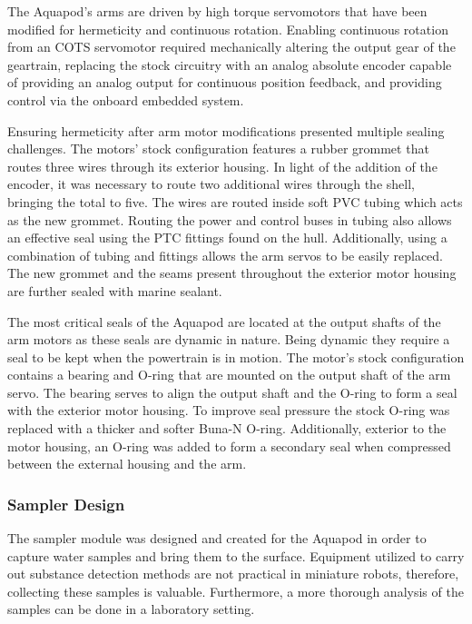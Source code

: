    The Aquapod's arms are driven by high torque servomotors that have been
    modified for hermeticity and continuous rotation. Enabling continuous
    rotation from an COTS servomotor required mechanically altering the output
    gear of the geartrain, replacing the stock circuitry with an analog absolute
    encoder capable of providing an analog output for continuous position
    feedback, and providing control via the onboard embedded system.

    Ensuring hermeticity after arm motor modifications presented multiple
    sealing challenges.  The motors' stock configuration features a rubber
    grommet that routes three wires through its exterior housing.  In light of
    the addition of the encoder, it was necessary to route two additional wires
    through the shell, bringing the total to five.  The wires are routed inside
    soft PVC tubing which acts as the new grommet. Routing the power and control
    buses in tubing also allows an effective seal using the PTC fittings found
    on the hull. Additionally, using a combination of tubing and fittings allows
    the arm servos to be easily replaced. The new grommet and the seams present
    throughout the exterior motor housing are further sealed with marine
    sealant.

  The most critical seals of the Aquapod are located at the output shafts of the
  arm motors as these seals are dynamic in nature. Being dynamic they require a
  seal to be kept when the powertrain is in motion. The motor's stock
  configuration contains a bearing and O-ring that are mounted on the output
  shaft of the arm servo. The bearing serves to align the output shaft and the
  O-ring to form a seal with the exterior motor housing. To improve seal
  pressure the stock O-ring was replaced with a thicker and softer Buna-N
  O-ring. Additionally, exterior to the motor housing, an O-ring was added to
  form a secondary seal when compressed between the external housing and the
  arm.

  \subsubsection{Sampler Design} The sampler module was designed and created for
  the Aquapod in order to capture water samples and bring them to the surface.
  Equipment utilized to carry out substance detection methods are not practical
  in miniature robots, therefore, collecting these samples is valuable.
  Furthermore, a more thorough analysis of the samples can be done in a
  laboratory setting.

